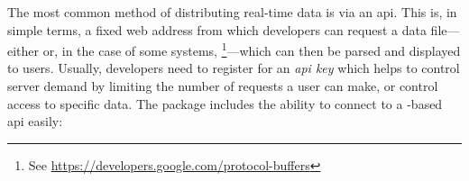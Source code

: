 The most common method of distributing real-time data is via an \gls{api}. This is, in simple terms, a fixed web address from which developers can request a data file---either  or, in the case of some \GTFS{} systems, \footnote{See \url{https://developers.google.com/protocol-buffers}}---which can then be parsed and displayed to users. Usually, developers need to register for an \emph{\gls{api} key} which helps to control server demand by limiting the number of requests a user can make, or control access to specific data. The  package includes the ability to connect to a \GTFS{}-based \gls{api} easily:
\begin{knitrout}\small
{}\color{fgcolor}
\end{knitrout}
